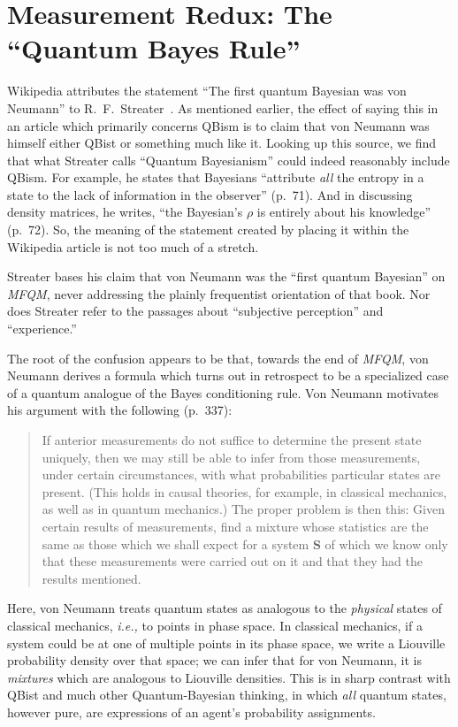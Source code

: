 \documentclass[aps,pra,superscriptaddress,12pt,tightenlines,nofootinbib]{revtex4-2}
\newcommand{\MFQM}{\textsl{MFQM}}
\begin{document}
\section{Measurement Redux: The ``Quantum Bayes Rule''}

Wikipedia attributes the statement ``The first quantum Bayesian was
von Neumann'' to R.\ F.\ Streater~\cite{Streater2007}.  As mentioned
earlier, the effect of saying this in an article which primarily
concerns QBism is to claim that von Neumann was himself either QBist
or something much like it.  Looking up this source, we find that what
Streater calls ``Quantum Bayesianism'' could indeed reasonably include
QBism.  For example, he states that Bayesians ``attribute \emph{all}
the entropy in a state to the lack of information in the observer''
(p.\ 71).  And in discussing density matrices, he writes, ``the
Bayesian's $\rho$ is entirely about his knowledge'' (p.\ 72).  So, the
meaning of the statement created by placing it within the Wikipedia
article is not too much of a stretch.

Streater bases his claim that von Neumann was the ``first quantum
Bayesian'' on \MFQM, never addressing the plainly frequentist
orientation of that book.  Nor does Streater refer to the passages
about ``subjective perception'' and ``experience.''

The root of the confusion appears to be that, towards the end of
\MFQM, von Neumann derives a formula which turns out in retrospect to
be a specialized case of a quantum analogue of the Bayes conditioning
rule.  Von Neumann motivates his argument with the following
(p.\ 337):
\begin{quotation}
If anterior measurements do not suffice to determine the present state
uniquely, then we may still be able to infer from those measurements,
under certain circumstances, with what probabilities particular states
are present.  (This  holds in causal theories, for example, in
classical mechanics, as well as in quantum mechanics.)  The proper
problem is then this:  Given certain results of measurements, find a
mixture whose statistics are the same as those which we shall expect
for a system {\bf S} of which we know only that these measurements
were carried out on it and that they had the results mentioned.
\end{quotation}
Here, von Neumann treats quantum states as analogous to the
\emph{physical} states of classical mechanics, \emph{i.e.,} to points
in phase space.  In classical mechanics, if a system could be at one
of multiple points in its phase space, we write a Liouville
probability density over that space; we can infer that for von
Neumann, it is \emph{mixtures} which are analogous to Liouville
densities.  This is in sharp contrast with QBist and much other
Quantum-Bayesian thinking, in which \emph{all} quantum states, however
pure, are expressions of an agent's probability assignments.
\end{document}
